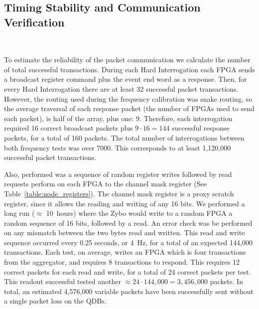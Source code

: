 




\subsection{Timing Stability and Communication Verification}~\label{sec:timing_test_results}

To estimate the reliability of the packet communication we calculate the number of total successful transactions.
During each Hard Interrogation each FPGA sends a broadcast register command plus the event end word as a response.
Then, for every Hard Interrogation there are at least 32 successful packet transactions. 
However, the routing used during the frequency calibration was snake routing, so the average traversal of each response packet (the number of FPGAs used to send each packet), is half of the array, plus one: 9.
Therefore, each interrogation required 16 correct broadcast packets plus $9\cdot 16 = 144$ successful response packets, for a total of 160 packets.
The total number of interrogations between both frequency tests was over 7000.
This corresponds to at least 1,120,000 successful packet transactions.

Also, performed was a sequence of random register writes followed by read requests perform on each FPGA to the channel mask register (See Table~\ref{table:node_registers}).
The channel mask register is a proxy scratch register, since it allows the reading and writing of any 16 bits.
We performed a long run ($\approx$ 10~\unit{hours}) where the Zybo would write to a random FPGA a random sequence of 16 bits, followed by a read.
An error check was be performed on any mismatch between the two bytes read and written.
This read and write sequence occurred every 0.25 seconds, or 4~\unit{Hz}, for a total of an expected 144,000 transactions.
Each test, on average, writes an FPGA which is four transactions from the aggregator, and requires 8 transactions to respond.
This requires 12 correct packets for each read and write, for a total of 24 correct packets per test.
This readout successful tested another $\approx 24\cdot 144,000 = 3,456,000$ packets.
In total, an estimated 4,576,000 variable packets have been successfully sent without a single packet loss on the QDBs.

